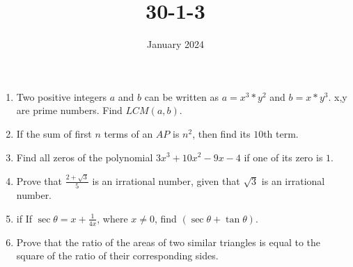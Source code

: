 \documentclass[12pt,-letter paper]{article}
\begin{document}
\title{30-1-3}
\date{January 2024}



\maketitle
\begin{enumerate} 
\item Two positive integers $a$ and $b$ can be written as $a = x^3*y^2$ and $b = x*y^3$. x,y are prime numbers. Find $LCM (a, b)$. 
\item If the sum of first $n$ terms of an $AP$ is $n^2$, then find its $10$th term.
\item Find all zeros of the polynomial $3x ^ 3 + 10x ^ 2 - 9x - 4$ if one of its zero is $1$.
\item Prove that $\frac{2+\sqrt{3}}{5}$  is an irrational number, given that $\sqrt{3}$ is an irrational number. 
\item if If $\sec\theta = x + \frac{1}{4x}$, where $x \neq 0$, find $(\sec\theta + \tan\theta)$.
\item Prove that the ratio of the areas of two similar triangles is equal to the square of the ratio of their corresponding sides.
\end{enumerate} 
\end{document}
